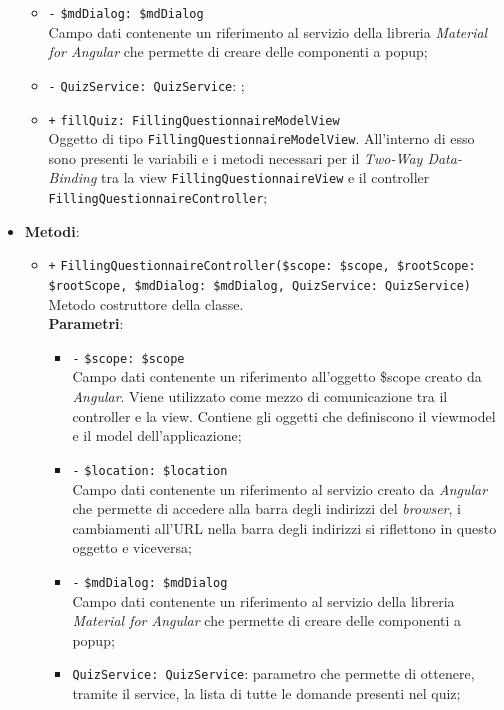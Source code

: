 \begin{itemize}
\begin{itemize}
		\item \texttt{-} \texttt{\$mdDialog: \$mdDialog} \\
		Campo dati contenente un riferimento al servizio della libreria \textit{Material for Angular} che permette di creare delle componenti a popup;
		\item \texttt{-} \texttt{QuizService: QuizService}: ;
		\item \texttt{+} \texttt{fillQuiz: FillingQuestionnaireModelView} \\
		Oggetto di tipo \texttt{FillingQuestionnaireModelView}. All'interno di esso sono presenti le variabili e i metodi necessari per il \textit{Two-Way Data-Binding} tra la view \texttt{FillingQuestionnaireView} e il controller \texttt{FillingQuestionnaireController};
	\end{itemize}
	\item \textbf{Metodi}:
	\begin{itemize}
		\item \texttt{+} \texttt{FillingQuestionnaireController(\$scope: \$scope, \$rootScope: \$rootScope, \$mdDialog: \$mdDialog, QuizService: QuizService)} \\Metodo costruttore della classe.\\
		\textbf{Parametri}:
		\begin{itemize}
			\item \texttt{-} \texttt{\$scope: \$scope} \\
			Campo dati contenente un riferimento all’oggetto \$scope creato da \textit{Angular}. Viene utilizzato come mezzo di comunicazione tra il controller e la view. Contiene gli oggetti che definiscono il viewmodel e il model dell’applicazione;
			\item \texttt{-} \texttt{\$location: \$location} \\
			Campo dati contenente un riferimento al servizio creato da \textit{Angular} che permette di accedere alla barra degli indirizzi del \textit{browser}, i cambiamenti all’URL nella barra degli indirizzi si riflettono in questo oggetto e viceversa;
			\item \texttt{-} \texttt{\$mdDialog: \$mdDialog} \\
			Campo dati contenente un riferimento al servizio della libreria \textit{Material for Angular} che permette di creare delle componenti a popup;
			\item \texttt{QuizService: QuizService}: parametro che permette di ottenere, tramite il service, la lista di tutte le domande presenti nel quiz;

\end{itemize}
\end{itemize}
\end{itemize}
